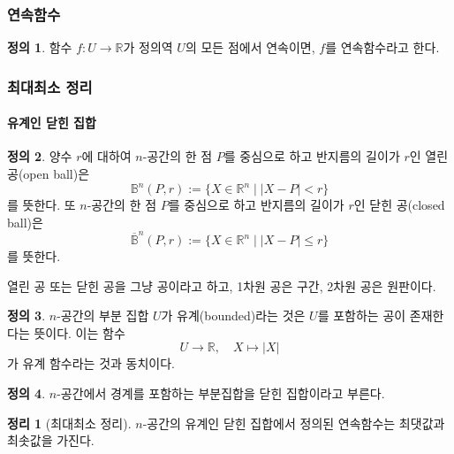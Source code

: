\documentclass[unfonts,oneside,a4paper]{oblivoir}
\theoremstyle{definition}
\newtheorem{definition}{정의}[subsubsection]
\theoremstyle{theorem}
\newtheorem{theorem}{정리}[subsubsection]
\begin{document}
\subsubsection{연속함수}

\begin{definition}
    함수 $f: U \rightarrow \mathbb R$가 정의역 $U$의 모든 점에서 연속이면, $f$를 연속함수라고 한다.
\end{definition}

\subsubsection{최대최소 정리}
\paragraph{유계인 닫힌 집합}

\begin{definition}
    양수 $r$에 대하여 $n$-공간의 한 점 $P$를 중심으로 하고 반지름의 길이가 $r$인 열린 공(open ball)은
    \begin{equation*}
        \mathbb B^n (P, r) := \{X \in \mathbb R^n \mid |X - P| < r\}
    \end{equation*}
    를 뜻한다. 또  $n$-공간의 한 점 $P$를 중심으로 하고 반지름의 길이가 $r$인 닫힌 공(closed ball)은
    \begin{equation*}
        \overline{\mathbb B}^n (P, r) := \{X \in \mathbb R^n \mid |X - P| \leq r\}
    \end{equation*}
    를 뜻한다.
    
    열린 공 또는 닫힌 공을 그냥 공이라고 하고, 1차원 공은 구간, 2차원 공은 원판이다.
\end{definition}

\begin{definition}
    $n$-공간의 부분 집합 $U$가 유계(bounded)라는 것은 $U$를 포함하는 공이 존재한다는 뜻이다.
    이는 함수
    \begin{equation*}
        U \rightarrow \mathbb R,\quad X \mapsto |X|
    \end{equation*}
    가 유계 함수라는 것과 동치이다.
\end{definition}

\begin{definition}
    $n$-공간에서 경계를 포함하는 부분집합을 닫힌 집합이라고 부른다.
\end{definition}

\begin{theorem} [최대최소 정리]
    $n$-공간의 유계인 닫힌 집합에서 정의된 연속함수는 최댓값과 최솟값을 가진다.
\end{theorem}
\end{document}
